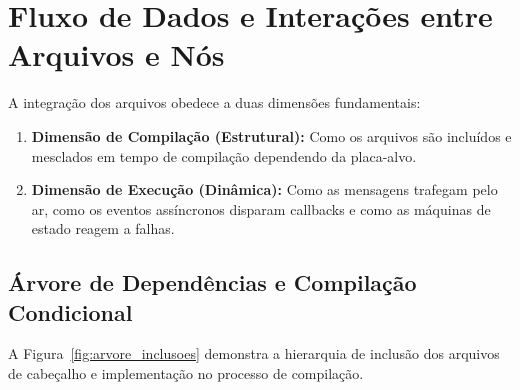 \documentclass[12pt,a4paper]{article}
\begin{document}
\newpage
\section{Fluxo de Dados e Interações entre Arquivos e Nós}

A integração dos arquivos obedece a duas dimensões fundamentais:
\begin{enumerate}
    \item \textbf{Dimensão de Compilação (Estrutural):} Como os arquivos são incluídos e mesclados em tempo de compilação dependendo da placa-alvo.
    \item \textbf{Dimensão de Execução (Dinâmica):} Como as mensagens trafegam pelo ar, como os eventos assíncronos disparam callbacks e como as máquinas de estado reagem a falhas.
\end{enumerate}

\subsection{Árvore de Dependências e Compilação Condicional}
A Figura~\ref{fig:arvore_inclusoes} demonstra a hierarquia de inclusão dos arquivos de cabeçalho e implementação no processo de compilação.
\end{document}
